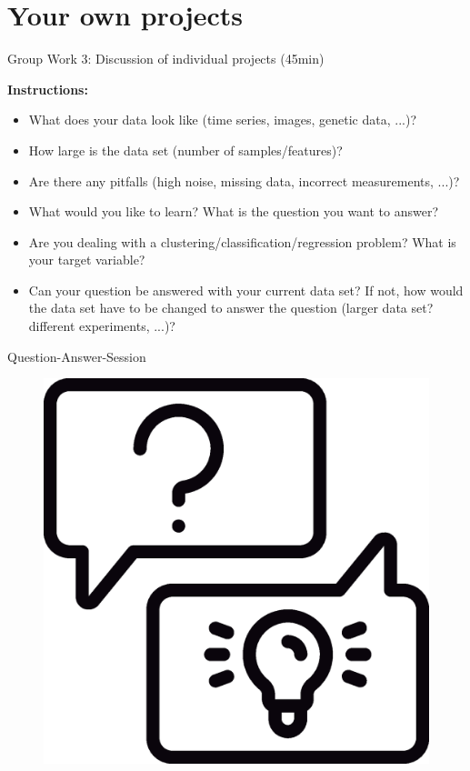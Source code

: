 \documentclass[aspectratio=169]{beamer}
\begin{document}
  \section{Your own projects}

\begin{frame}{Group Work 3: Discussion of individual projects (45min)}
    
    \textbf{Instructions:}
    \small
    \begin{itemize}
        \item What does your data look like (time series, images, genetic data, ...)?
        \item How large is the data set (number of samples/features)?
        \item Are there any pitfalls (high noise, missing data, incorrect measurements, ...)?
        \item What would you like to learn? What is the question you want to answer?
        \item Are you dealing with a clustering/classification/regression problem? What is your target variable?
        \item Can your question be answered with your current data set? If not, how would the data set have to be changed to answer the question (larger data set?        different experiments, ...)?
    \end{itemize}
\end{frame}

\begin{frame}{Question-Answer-Session}
    \begin{figure}
        \centering
        \includegraphics[scale=0.3]{figures/question_answer.eps}
    \end{figure}
\end{frame}
\end{document}

